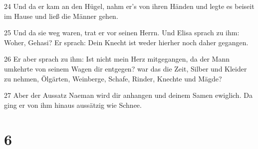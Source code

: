 \par 24 Und da er kam an den Hügel, nahm er's von ihren Händen und legte es beiseit im Hause und ließ die Männer gehen.
\par 25 Und da sie weg waren, trat er vor seinen Herrn. Und Elisa sprach zu ihm: Woher, Gehasi? Er sprach: Dein Knecht ist weder hierher noch daher gegangen.
\par 26 Er aber sprach zu ihm: Ist nicht mein Herz mitgegangen, da der Mann umkehrte von seinem Wagen dir entgegen? war das die Zeit, Silber und Kleider zu nehmen, Ölgärten, Weinberge, Schafe, Rinder, Knechte und Mägde?
\par 27 Aber der Aussatz Naeman wird dir anhangen und deinem Samen ewiglich. Da ging er von ihm hinaus aussätzig wie Schnee.

\chapter{6}

